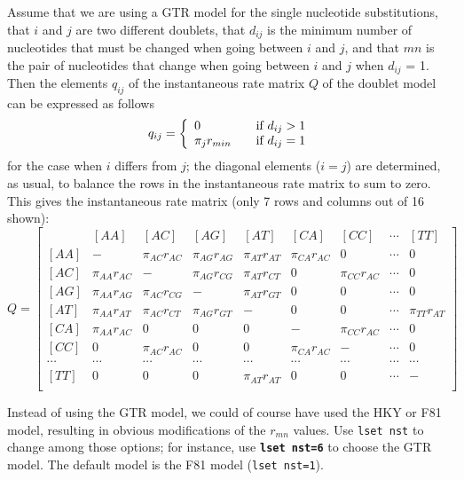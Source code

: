 \documentclass[12pt]{book}
\newcommand{\ttt}[1]{\texttt{#1}}
\newcommand{\tb}[1]{\ttt{\textbf{#1}}}
\begin{document}
Assume that we are using a GTR model for the single nucleotide substitutions, that $i$ and $j$ are
two different doublets, that $d_{ij}$ is the minimum number of nucleotides that must be changed
when going between $i$ and $j$, and that $mn$ is the pair of nucleotides that change when going
between $i$ and $j$ when $d_{ij}$ = 1. Then the elements $q_{ij}$ of the instantaneous rate matrix
$Q$ of the doublet model can be expressed as follows
\[
q_{ij} = \left\{
\begin{array}{l l}
  0 & \quad \text{if} ~d_{ij}>1 \\
 \pi_j r_{min} & \quad \text{if} ~d_{ij}=1\\
\end{array} \right.
\]
for the case when $i$ differs from $j$; the diagonal elements ($i = j$) are determined, as usual,
to balance the rows in the instantaneous rate matrix to sum to zero. This gives the instantaneous
rate matrix (only 7 rows and columns out of 16 shown):
\footnotesize
\[
Q=\begin{bmatrix}
    & [AA] & [AC] & [AG] & [AT] & [CA] & [CC] & \cdots & [TT]\\
 [AA]& - & \pi_{AC} r_{AC} & \pi_{AG} r_{AG} & \pi_{AT} r_{AT}& \pi_{CA} r_{AC} & 0 & \cdots & 0\\
 [AC]& \pi_{AA} r_{AC} & - & \pi_{AG} r_{CG} & \pi_{AT} r_{CT}& 0 & \pi_{CC} r_{AC} & \cdots & 0\\
 [AG]& \pi_{AA} r_{AG} & \pi_{AC} r_{CG} & - & \pi_{AT} r_{GT}& 0 & 0 & \cdots & 0 \\
 [AT]& \pi_{AA} r_{AT} & \pi_{AC} r_{CT} & \pi_{AG} r_{GT}& -& 0 & 0 & \cdots &  \pi_{TT} r_{AT}\\
 [CA]& \pi_{AA} r_{AC} & 0 & 0 & 0 & - &  \pi_{CC} r_{AC} & \cdots & 0\\
 [CC]& 0 & \pi_{AC} r_{AC} & 0 & 0 & \pi_{CA} r_{AC} & -  & \cdots & 0\\
 \cdots& \cdots& \cdots& \cdots& \cdots& \cdots& \cdots& \cdots& \cdots\\
 [TT]& 0 & 0 & 0 &\pi_{AT} r_{AT} & 0 & 0 & \cdots & -\\
\end{bmatrix}
\]
\normalsize

Instead of using the GTR model, we could of course have used the HKY or F81 model, resulting in
obvious modifications of the $r_{mn}$ values. Use \ttt{lset nst} to change among those options; for
instance, use \tb{lset nst=6} to choose the GTR model. The default model is the F81 model
(\ttt{lset nst=1}).
\end{document}
